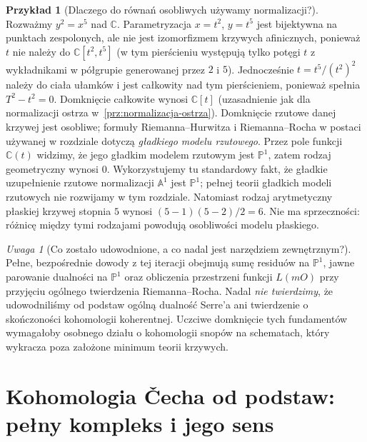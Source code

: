 \documentclass[11pt,a4paper,openany]{report}
\numberwithin{equation}{section}
\theoremstyle{plain}
\theoremstyle{definition}
\newtheorem{przyklad}[twierdzenie]{Przykład}
\theoremstyle{remark}
\newtheorem{uwaga}[twierdzenie]{Uwaga}
\newcommand{\C}{\mathbb C}
\newcommand{\A}{\mathbb A}
\newcommand{\PP}{\mathbb P}
\begin{document}
\begin{przyklad}[Dlaczego do równań osobliwych używamy normalizacji?]
Rozważmy $y^2=x^5$ nad $\C$.
Parametryzacja $x=t^2$, $y=t^5$ jest bijektywna
na punktach zespolonych, ale nie jest izomorfizmem
krzywych afinicznych, ponieważ $t$ nie należy do
$\C[t^2,t^5]$ (w tym pierścieniu występują tylko potęgi
$t$ z wykładnikami w półgrupie generowanej przez $2$ i $5$).
Jednocześnie $t=t^5/(t^2)^2$ należy do ciała ułamków i jest
całkowity nad tym pierścieniem, ponieważ spełnia
$T^2-t^2=0$. Domknięcie całkowite wynosi $\C[t]$
(uzasadnienie jak dla normalizacji ostrza w~\ref{prz:normalizacja-ostrza}).
Domknięcie rzutowe danej krzywej jest osobliwe;
formuły Riemanna--Hurwitza i Riemanna--Rocha
w postaci używanej w rozdziale dotyczą \emph{gładkiego
modelu rzutowego}. Przez pole funkcji $\C(t)$ widzimy,
że jego gładkim modelem rzutowym jest $\PP^1$,
zatem rodzaj geometryczny wynosi $0$. Wykorzystujemy tu
standardowy fakt, że gładkie uzupełnienie rzutowe
normalizacji $\A^1$ jest $\PP^1$; pełnej teorii
gładkich modeli rzutowych nie rozwijamy w tym rozdziale.
Natomiast rodzaj arytmetyczny płaskiej krzywej
stopnia $5$ wynosi $(5-1)(5-2)/2=6$.
Nie ma sprzeczności: różnicę między tymi
rodzajami powodują osobliwości modelu płaskiego.
\end{przyklad}

\begin{uwaga}[Co zostało udowodnione, a co nadal jest narzędziem zewnętrznym?]
Pełne, bezpośrednie dowody z tej iteracji obejmują
sumę residuów na $\PP^1$, jawne parowanie dualności
na $\PP^1$ oraz obliczenia przestrzeni funkcji
$L(mO)$ przy przyjęciu ogólnego twierdzenia
Riemanna--Rocha. Nadal \emph{nie twierdzimy}, że
udowodniliśmy od podstaw ogólną dualność Serre'a
ani twierdzenie o skończoności kohomologii koherentnej.
Uczciwe domknięcie tych fundamentów wymagałoby
osobnego działu o kohomologii snopów na schematach,
który wykracza poza założone minimum teorii krzywych.
\end{uwaga}

\section{Kohomologia Čecha od podstaw: pełny kompleks i jego sens}
\label{sec:cech-full}
\end{document}
